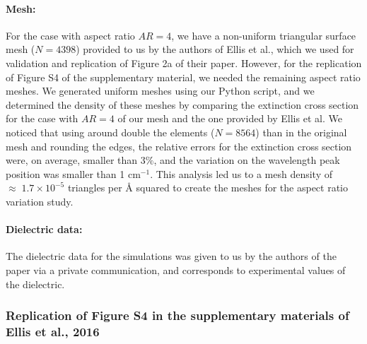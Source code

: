 \paragraph{Mesh:}
For the case with aspect ratio $AR=4$, we have a non-uniform triangular surface mesh ($N=4398$) provided to us by the authors of 
Ellis et al., which we used for validation and replication of Figure 2a of their paper. However, for the replication
of Figure S4 of the supplementary material, we needed the remaining aspect ratio meshes. We generated uniform meshes using our
Python script, and we determined the density of these meshes by comparing the extinction cross section for the case with $AR=4$ of 
our mesh and the one provided by Ellis et al. We noticed that using around double the elements ($N=8564$) than in the original mesh and 
rounding the edges, the relative errors for the extinction cross section were, on average, smaller than 3$\%$, and the variation on the wavelength peak
position was smaller than 1 cm$^{-1}$. This analysis led us to a mesh density of $\approx \; 1.7 \times10^{-5}$ triangles per $\text{\AA}$ squared to create the meshes for 
the aspect ratio variation study.


\paragraph{Dielectric data:}
The dielectric data for the simulations was given to us by the authors of the paper via a private communication, 
and corresponds to experimental values of the dielectric. 

\subsubsection{Replication of Figure S4 in the supplementary materials of Ellis et al., 2016}

